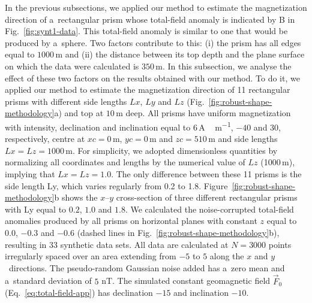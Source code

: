 \documentclass[journal abbreviation, npg]{copernicus}
\begin{document}
In the previous subsections, we applied our method to estimate the
magnetization direction of a~rectangular prism whose total-field anomaly is
indicated by B in Fig.~\ref{fig:synt1-data}. This total-field anomaly is
similar to one that would be produced by a~sphere. Two factors contribute to
this: (i) the prism has all edges equal to $1000$\,\unit{m} and (ii) the
distance between its top depth and the plane surface on which the data were
calculated is $350$\,\unit{m}. In this subsection, we analyse the effect of
these two factors on the results obtained with our method. To do it, we
applied our method to estimate the magnetization direction of 11 rectangular
prisms with different side lengths $Lx$, $Ly$ and $Lz$
(Fig.~\ref{fig:robust-shape-methodology}a) and top at $10$\,\unit{m} deep.
All prisms have uniform magnetization with intensity, declination and
inclination equal to $6$\,\unit{A\,m^{-1}}, $-40${\degree} and $30${\degree},
respectively, centre at $xc = 0$\,\unit{m}, $yc = 0$\,\unit{m} and $zc =
510$\,\unit{m} and side lengths $Lx=Lz=1000$\,\unit{m}. For simplicity, we
adopted dimensionless quantities by normalizing all coordinates and lengths
by the numerical value of $Lz$ (1000\,\unit{m}), implying that $Lx=Lz=1.0$.
The only difference between these 11 prisms is the side length Ly, which
varies regularly from 0.2 to 1.8. Figure~\ref{fig:robust-shape-methodology}b
shows the $x$--$y$ cross-section of three different rectangular prisms with
Ly equal to $0.2$, $1.0$ and $1.8$. We calculated the noise-corrupted
total-field anomalies produced by all prisms on horizontal planes with
constant $z$ equal to $0.0$, $-0.3$ and $-0.6$ (dashed lines in
Fig.~\ref{fig:robust-shape-methodology}b), resulting in $33$ synthetic data
sets. All data are calculated at $N = 3000$ points irregularly spaced over an
area extending from $-5$ to $5$ along the $x$ and $y$~directions. The
pseudo-random Gaussian noise added has a~zero mean and a~standard deviation
of $5$ nT. The simulated constant geomagnetic field $\vec{F}_{0}$
(Eq.~\ref{eq:total-field-app}) has declination $-15${\degree} and inclination
$-10${\degree}.
\end{document}

